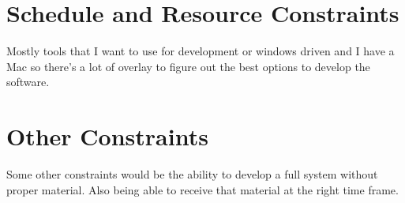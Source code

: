\section{Schedule and Resource Constraints}
\label{loc:RWO_ScheduleAndResourceConstraints}
% 

Mostly tools that I want to use for development or windows driven and I have a Mac so there's a lot of overlay to figure out the best options to develop the software.

\section{Other Constraints}
\label{loc:RWO_OtherConstraints}
% 

Some other constraints would be the ability to develop a full system without proper material. Also being able to receive that material at the right time frame.